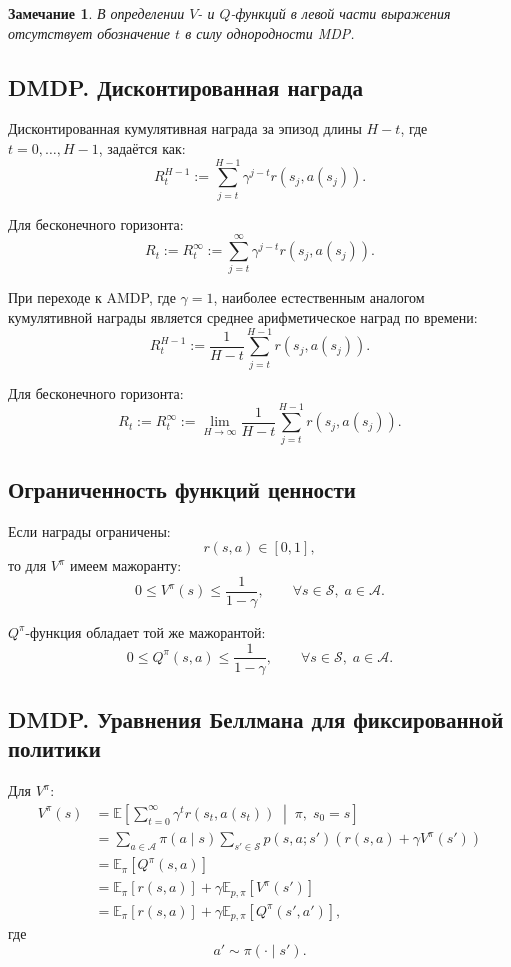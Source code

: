 \documentclass[12pt,a4paper]{article}
\newtheorem{remark}{Замечание}
\begin{document}
\begin{remark}
В определении $V$- и $Q$-функций в левой части выражения отсутствует обозначение $t$ в силу однородности MDP.
\end{remark}

\subsection{DMDP. Дисконтированная награда}

Дисконтированная кумулятивная награда за эпизод длины $H-t$, где $t=0,\ldots,H-1$, задаётся как:
\[
R_t^{H-1}
:=
\sum_{j=t}^{H-1}
\gamma^{j-t} r(s_j,a(s_j)).
\]

Для бесконечного горизонта:
\[
R_t := R_t^\infty
:=
\sum_{j=t}^{\infty}
\gamma^{j-t} r(s_j,a(s_j)).
\]

При переходе к AMDP, где $\gamma=1$, наиболее естественным аналогом кумулятивной награды является среднее арифметическое наград по времени:
\[
R_t^{H-1}
:=
\frac{1}{H-t}
\sum_{j=t}^{H-1}
r(s_j,a(s_j)).
\]

Для бесконечного горизонта:
\[
R_t := R_t^\infty
:=
\lim_{H \to \infty}
\frac{1}{H-t}
\sum_{j=t}^{H-1}
r(s_j,a(s_j)).
\]

\subsection{Ограниченность функций ценности}

Если награды ограничены:
\[
r(s,a) \in [0,1],
\]
то для $V^\pi$ имеем мажоранту:
\[
0 \le V^\pi(s) \le \frac{1}{1-\gamma},
\qquad
\forall s \in \mathcal S,\; a \in \mathcal A.
\]

$Q^\pi$-функция обладает той же мажорантой:
\[
0 \le Q^\pi(s,a) \le \frac{1}{1-\gamma},
\qquad
\forall s \in \mathcal S,\; a \in \mathcal A.
\]

\subsection{DMDP. Уравнения Беллмана для фиксированной политики}

Для $V^\pi$:
\[
\begin{aligned}
V^\pi(s)
&=
\mathbb E
\left[
\sum_{t=0}^{\infty}
\gamma^t r(s_t,a(s_t))
\;\middle|\;
\pi,\; s_0=s
\right]
\\
&=
\sum_{a \in \mathcal A}
\pi(a \mid s)
\sum_{s' \in \mathcal S}
p(s,a;s')
\left(
r(s,a) + \gamma V^\pi(s')
\right)
\\
&=
\mathbb E_\pi \left[ Q^\pi(s,a) \right]
\\
&=
\mathbb E_\pi \left[ r(s,a) \right]
+
\gamma \mathbb E_{p,\pi}
\left[
V^\pi(s')
\right]
\\
&=
\mathbb E_\pi \left[ r(s,a) \right]
+
\gamma \mathbb E_{p,\pi}
\left[
Q^\pi(s',a')
\right],
\end{aligned}
\]
где
\[
a' \sim \pi(\cdot \mid s').
\]
\end{document}
